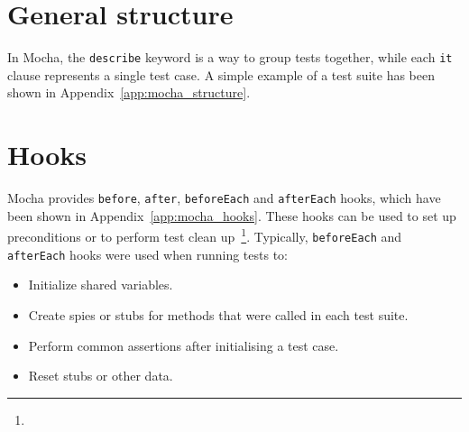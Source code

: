 \section{General structure} {
\label{sec:testing_structure}

	In Mocha, the \texttt{describe} keyword is a way to group tests together, while each \texttt{it} clause represents a single test case. A simple example of a test suite has been shown in Appendix~\ref{app:mocha_structure}.

}

\section{Hooks} {
\label{sec:testing_hooks}

	Mocha provides \texttt{before}, \texttt{after}, \texttt{beforeEach} and \texttt{afterEach} hooks, which have been shown in Appendix~\ref{app:mocha_hooks}. These hooks can be used to set up preconditions or to perform test clean up~\footnote{}. Typically, \texttt{beforeEach} and \texttt{afterEach} hooks were used when running tests to:

	\begin{itemize}
		\item Initialize shared variables.
		\item Create spies or stubs for methods that were called in each test suite.
		\item Perform common assertions after initialising a test case.
		\item Reset stubs or other data.
	\end{itemize}

}

